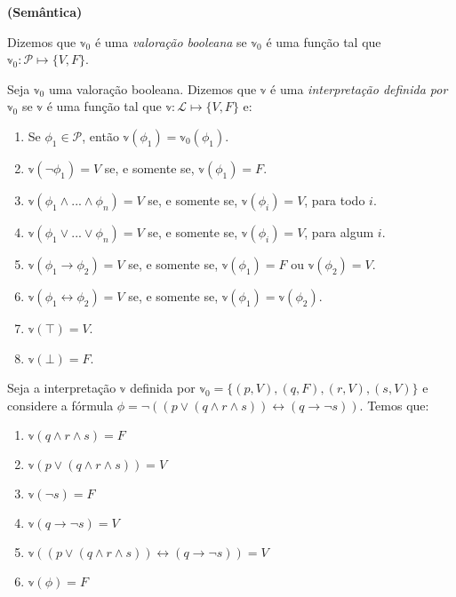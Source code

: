 \begin{definition}\textbf{(Semântica)}
	
	Dizemos que $\mathbb{v}_0$ é uma \emph{valoração booleana} se $\mathbb{v}_0$ é uma função tal que\break $\mathbb{v}_0 : \mathcal{P} \longmapsto \{V,F\}$.
    
    Seja $\mathbb{v}_0$ uma valoração booleana. Dizemos que $\mathbb{v}$ é uma \emph{interpretação definida por $\mathbb{v}_0$} se $\mathbb{v}$ é uma função tal que $\mathbb{v} : \mathcal{L} \longmapsto \{V,F\}$ e:
    \begin{enumerate}
        \item Se $\phi_1 \in \mathcal{P}$, então $\mathbb{v}(\phi_1) = \mathbb{v}_0(\phi_1)$.
        \item $\mathbb{v}(\neg \phi_1) = V$ se, e somente se, $\mathbb{v}(\phi_1) = F$.
        \item $\mathbb{v}(\phi_1 \wedge ... \wedge \phi_n) = V$ se, e somente se, $\mathbb{v}(\phi_i) = V$, para todo $i$.
        \item $\mathbb{v}(\phi_1 \vee ... \vee \phi_n) = V$ se, e somente se, $\mathbb{v}(\phi_i) = V$, para algum $i$.
        \item $\mathbb{v}(\phi_1 \rightarrow \phi_2) = V$ se, e somente se, $\mathbb{v}(\phi_1) = F$ ou $\mathbb{v}(\phi_2) = V$.
        \item $\mathbb{v}(\phi_1 \leftrightarrow \phi_2) = V$ se, e somente se, $\mathbb{v}(\phi_1) = \mathbb{v}(\phi_2)$.
        \item $\mathbb{v}(\top) = V$.
        \item $\mathbb{v}(\bot) = F$.
    \end{enumerate}
\end{definition}

\begin{example}
    Seja a interpretação $\mathbb{v}$ definida por $\mathbb{v}_0 = \{(p,V),(q,F),(r,V),(s,V)\}$ e considere a fórmula $\phi = \neg((p \vee (q \wedge r \wedge s)) \leftrightarrow (q \rightarrow \neg s))$. Temos que:
    \begin{enumerate}
        \item $\mathbb{v}(q \wedge r \wedge s) = F$
        \item $\mathbb{v}(p \vee (q \wedge r \wedge s)) = V$
        \item $\mathbb{v}(\neg s) = F$
        \item $\mathbb{v}(q \rightarrow \neg s) = V$
        \item $\mathbb{v}((p \vee (q \wedge r \wedge s)) \leftrightarrow (q \rightarrow \neg s)) = V$
        \item $\mathbb{v}(\phi) = F$
    \end{enumerate}
\end{example}


